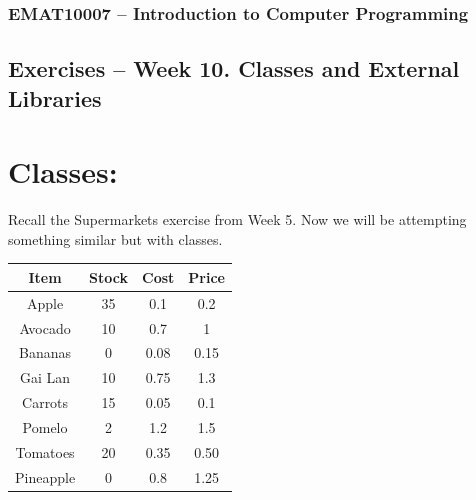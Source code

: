 \documentclass[12pt]{article}
\begin{document}
\subsubsection*{EMAT10007 -- Introduction to Computer Programming}
\subsection*{\Large Exercises -- Week 10. Classes and External Libraries}

\section*{Classes:}

\begin{Exercise}[title=Supermarkets with Classes]

Recall the Supermarkets exercise from Week 5. Now we will be attempting something similar but with classes.
    \begin{center}
     \begin{tabular}{||c c c c||} 
     \hline
     Item & Stock & Cost & Price \\ [0.5ex] 
     \hline\hline
     Apple & 35 & 0.1 & 0.2 \\ 
     \hline
     Avocado & 10 & 0.7 & 1 \\
     \hline
     Bananas & 0 & 0.08 & 0.15 \\
     \hline
     Gai Lan & 10 & 0.75 & 1.3 \\
     \hline
     Carrots & 15 & 0.05 & 0.1 \\
     \hline
     Pomelo & 2 & 1.2 & 1.5 \\
     \hline
     Tomatoes & 20 & 0.35 & 0.50 \\
     \hline
     Pineapple & 0 & 0.8 & 1.25 \\ [1ex] 
     \hline
    \end{tabular}
    \end{center}
\end{Exercise}
\end{document}
